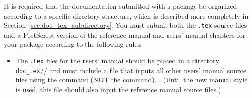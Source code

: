 It is required that the documentation submitted with a package be organized
according to a specific directory structure, which is described more
completely in Section~\ref{sec:doc_tex_subdirectory}.  You must submit
both the {\tt .tex} source files and a PostScript version of the reference
manual and users' manual chapters for your package according to the following
rules:
\begin{itemize}  
   \item The {\tt .tex} files for the users' manual%
          should be placed in a 
         directory \verb|doc_tex|//%
         and must include a file 
         that inputs all other users' 
         manual source files using the \verb|| command (NOT the
         \verb|| command).%
         .
         (Until the new manual style is used, this
         file should also input the reference manual source files.)%


\end{itemize}
